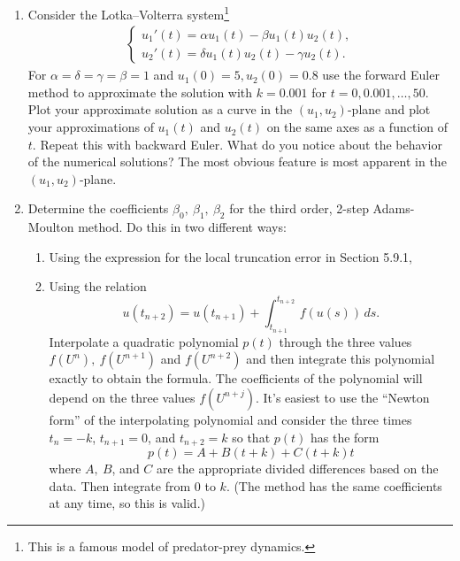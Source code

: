\documentclass[10pt]{amsart}
\begin{document}
\begin{enumerate}[label={\bf Problem~{\arabic*}:}]
\item Consider the Lotka--Volterra system\footnote{This is a famous model of predator-prey dynamics.}
  \begin{align*}
    \begin{cases}
      u_1'(t) = \alpha u_1(t) - \beta u_1(t) u_2(t),\\
      u_2'(t) = \delta u_1(t) u_2(t) - \gamma u_2(t).
      \end{cases}
    \end{align*}
    For $\alpha = \delta = \gamma = \beta = 1$ and $u_1(0) = 5, u_2(0) = 0.8$ use the forward Euler method to approximate the solution with $k = 0.001$ for $t = 0,0.001,\ldots,50$.  Plot your approximate solution as a curve in the $(u_1,u_2)$-plane and plot your approximations of $u_1(t)$ and $u_2(t)$ on the same axes as a function of $t$.  Repeat this with backward Euler.  What do you notice about the behavior of the numerical solutions?  The most obvious feature is most apparent in the $(u_1,u_2)$-plane.

    \mline

    \item Determine the coefficients $\beta_0,~\beta_1,~\beta_2$ for the third
order, 2-step Adams-Moulton method.  Do this in two different ways:
\begin{enumerate} 
 \item Using the expression for the local truncation error in Section 5.9.1,
 \item Using the relation
 \[
 u(t_{n+2}) = u(t_{n+1}) + \int_{t_{n+1}}^{t_{n+2}}\,f(u(s))\,ds.
 \]
 Interpolate  a quadratic polynomial $p(t)$ through the three values
 $f(U^n),~f(U^{n+1})$ and $f(U^{n+2})$ and then integrate this polynomial
 exactly to obtain the formula.  The coefficients of the polynomial will
 depend on the three values $f(U^{n+j})$.   It's easiest to use the
 ``Newton form'' of the interpolating polynomial and consider the three
times $t_n=-k$, $t_{n+1}=0$, and $t_{n+2}=k$ so that $p(t)$ has the form
\[
p(t) = A + B(t+k) + C(t+k)t
\]
where $A,~B$, and $C$ are the appropriate divided differences based on the
data.  Then integrate from $0$ to $k$.   (The method has the same
coefficients at any time, so this is valid.)
\end{enumerate}
  \end{enumerate}
\end{document}
